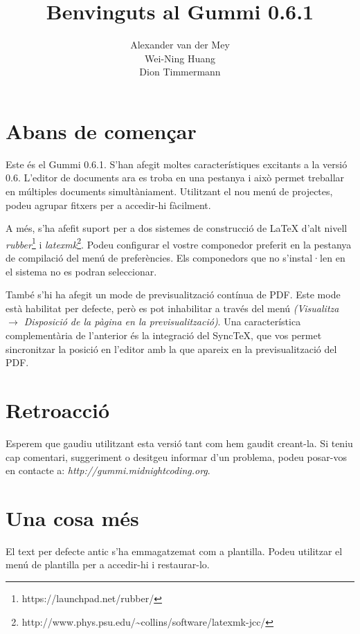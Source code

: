 \documentclass[11pt]{article}
\title{\textbf{Benvinguts al Gummi 0.6.1}}
\author{Alexander van der Mey\\
		Wei-Ning Huang\\
		Dion Timmermann}
\date{}
\begin{document}
\maketitle

\section{Abans de començar}

Este és el Gummi 0.6.1. S'han afegit moltes característiques excitants a la versió 0.6. L'editor de documents ara es troba en una pestanya i això permet treballar en múltiples documents simultàniament. Utilitzant el nou menú de projectes, podeu agrupar fitxers per a accedir-hi fàcilment. 

A més, s'ha afefit suport per a dos sistemes de construcció de {\LaTeX} d'alt nivell \emph{rubber}\footnote{https://launchpad.net/rubber/}  i \emph{latexmk}\footnote{http://www.phys.psu.edu/{\textasciitilde}collins/software/latexmk-jcc/}. Podeu configurar el vostre componedor preferit en la pestanya de compilació del menú de preferències. Els componedors que no s'instal·len en el sistema no es podran seleccionar. 

També s'hi ha afegit un mode de previsualització contínua de PDF. Este mode està habilitat per defecte, però es pot inhabilitar a través del menú \emph{(Visualitza $\rightarrow$ Disposició de la pàgina en la previsualització)}. Una característica complementària de l'anterior és la integració del SyncTeX, que vos permet sincronitzar la posició en l'editor amb la que apareix en la previsualització del PDF. 

\section{Retroacció}
Esperem que gaudiu utilitzant esta versió tant com hem gaudit creant-la. Si teniu cap comentari, suggeriment o desitgeu informar d'un problema, podeu posar-vos en contacte a: \emph{http://gummi.midnightcoding.org}.

\section{Una cosa més}
El text per defecte antic s'ha emmagatzemat com a plantilla. Podeu utilitzar el menú de plantilla per a accedir-hi i restaurar-lo. 
\end{document}
